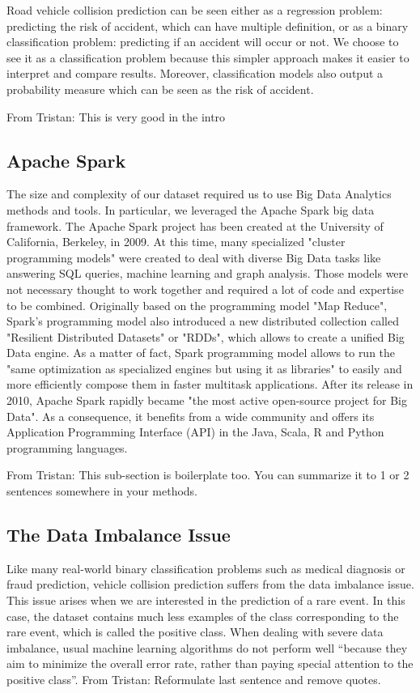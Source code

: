 \documentclass[conference]{IEEEtran}
\newcommand{\TG}[1]{\colorlet{saved}{.}\color{orange}From Tristan: #1\color{saved}}
\begin{document}
Road vehicle collision prediction can be seen either as a regression problem: predicting the risk of accident, which can have multiple definition, or as a binary classification problem: predicting if an accident will occur or not. We choose to see it as a classification problem because this simpler approach makes it easier to interpret and compare results. Moreover, classification models also output a probability measure which can be seen as the risk of accident.

\TG{This is very good in the intro}

\subsection{Apache Spark}

The size and complexity of our dataset required us to use Big Data Analytics methods and tools. In particular, we leveraged the Apache Spark\cite{spark} big data framework. The Apache Spark project has been created at the University of California, Berkeley, in 2009. At this time, many specialized "cluster programming models" were created to deal with diverse Big Data tasks like answering SQL queries, machine learning and graph analysis\cite{spark}. Those models were not necessary thought to work together and required a lot of code and expertise to be combined. Originally based on the programming model "Map Reduce"\cite{mapreduce}, Spark's programming model also introduced a new distributed collection called "Resilient Distributed Datasets" or "RDDs", which allows to create a unified Big Data engine. As a matter of fact, Spark programming model allows to run the "same optimization as specialized engines but using it as libraries" to easily and more efficiently compose them in faster multitask applications. After its release in 2010, Apache Spark rapidly became "the most active open-source project for Big Data"\cite{spark}. As a consequence, it benefits from a wide community and offers its Application Programming Interface (API) in the Java, Scala, R and Python programming languages. 

\TG{This sub-section is boilerplate too. You can summarize it to 1 or 2 sentences somewhere in your methods.}

\subsection{The Data Imbalance Issue}

Like many real-world binary classification problems such as medical diagnosis or fraud prediction, vehicle collision prediction suffers from the data imbalance issue. This issue arises when we are interested in the prediction of a rare event. In this case, the dataset contains much less examples of the class corresponding to the rare event, which is called the positive class. When dealing with severe data imbalance, usual machine learning algorithms do not perform well ``because they aim to minimize the overall error rate, rather than paying special attention to the positive class''\cite{Chen2004}. \TG{Reformulate last sentence and remove quotes.}
\end{document}
